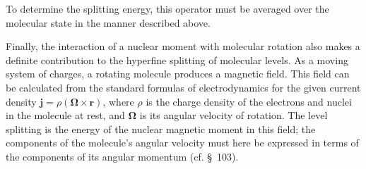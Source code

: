 To determine the splitting energy, this operator must be averaged over the
molecular state in the manner described above.



Finally, the interaction of a nuclear moment with molecular rotation also
makes a definite contribution to the hyperfine splitting of molecular
levels. As a moving system of charges, a rotating molecule produces a
magnetic field. This field can be calculated from the standard formulas of
electrodynamics for the given current density
$\mathbf j=\rho(\boldsymbol\Omega\times\mathbf r)$, where $\rho$ is the charge
density of the electrons and nuclei in the molecule at rest, and
$\boldsymbol\Omega$ is its angular velocity of rotation. The level splitting
is the energy of the nuclear magnetic moment in this field; the components of
the molecule's angular velocity must here be expressed in terms of the
components of its angular momentum (cf. \S~103).
